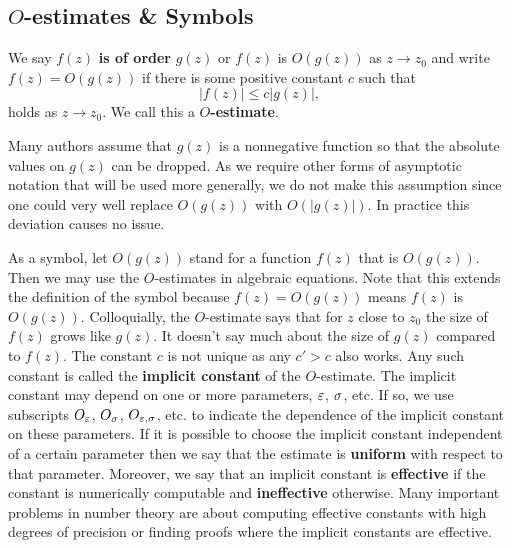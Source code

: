       \subsection*{\texorpdfstring{$O$}{O}-estimates \& Symbols}
        We say $f(z)$ \textbf{is of order} $g(z)$ or $f(z)$ is $O(g(z))$ as $z \to z_{0}$ and write $f(z) = O(g(z))$
        if there is some positive constant $c$ such that
        \[
          |f(z)| \le c|g(z)|,
        \]
        holds as $z \to z_{0}$. We call this a \textbf{$O$-estimate}.
        
        \begin{remark}
          Many authors assume that $g(z)$ is a nonnegative function so that the absolute values on $g(z)$ can be dropped. As we require other forms of asymptotic notation that will be used more generally, we do not make this assumption since one could very well replace $O(g(z))$ with $O(|g(z)|)$. In practice this deviation causes no issue.
        \end{remark}
        
        As a symbol, let $O(g(z))$ stand for a function $f(z)$ that is $O(g(z))$. Then we may use the $O$-estimates in algebraic equations. Note that this extends the definition of the symbol because $f(z) = O(g(z))$ means $f(z)$ is $O(g(z))$. Colloquially, the $O$-estimate says that for $z$ close to $z_{0}$ the size of $f(z)$ grows like $g(z)$. It doesn't say much about the size of $g(z)$ compared to $f(z)$. The constant $c$ is not unique as any $c' > c$ also works. Any such constant is called the \textbf{implicit constant} of the $O$-estimate. The implicit constant may depend on one or more parameters, $\varepsilon$, $\sigma$, etc. If so, we use subscripts $O_{\varepsilon}$, $O_{\sigma}$, $O_{\varepsilon,\sigma}$, etc. to indicate the dependence of the implicit constant on these parameters. If it is possible to choose the implicit constant independent of a certain parameter then we say that the estimate is \textbf{uniform} with respect to that parameter. Moreover, we say that an implicit constant is \textbf{effective} if the constant is numerically computable and \textbf{ineffective} otherwise. Many important problems in number theory are about computing effective constants with high degrees of precision or finding proofs where the implicit constants are effective.

